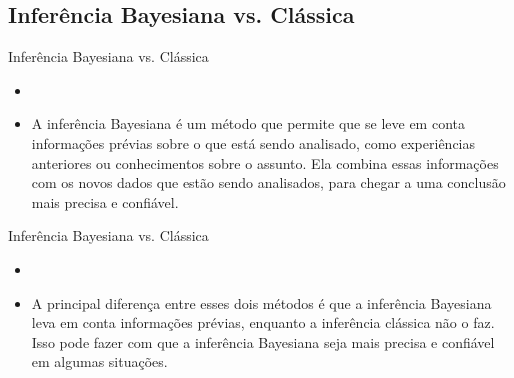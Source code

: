 \documentclass{beamer}
\theoremstyle{definition}
\begin{document}
\subsection{Inferência Bayesiana vs. Clássica}
\begin{frame}{Inferência Bayesiana vs. Clássica}
    
    \begin{itemize}
    
    \item {}
    \vspace{1cm}
    \item A inferência Bayesiana é um método que permite que se leve em conta informações prévias sobre o que está sendo analisado, como experiências anteriores ou conhecimentos sobre o assunto. Ela combina essas informações com os novos dados que estão sendo analisados, para chegar a uma conclusão mais precisa e confiável. 
    \end{itemize}
    
\end{frame}

\begin{frame}{Inferência Bayesiana vs. Clássica}
 \begin{itemize}
    \item {}
    \vspace{1cm}
    \item A principal diferença entre esses dois métodos é que a inferência Bayesiana leva em conta informações prévias, enquanto a inferência clássica não o faz. Isso pode fazer com que a inferência Bayesiana seja mais precisa e confiável em algumas situações.
    \end{itemize}
    
\end{frame}
\end{document}
